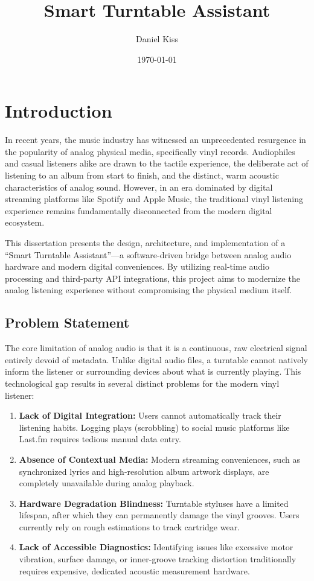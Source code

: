 \documentclass[12pt,a4paper,english]{report}
\title{Smart Turntable Assistant}
\author{Daniel Kiss}
\date{\today}
\begin{document}
\maketitle
\tableofcontents

\chapter{Introduction}

In recent years, the music industry has witnessed an unprecedented resurgence in the popularity of analog physical media, specifically vinyl records. Audiophiles and casual listeners alike are drawn to the tactile experience, the deliberate act of listening to an album from start to finish, and the distinct, warm acoustic characteristics of analog sound. However, in an era dominated by digital streaming platforms like Spotify and Apple Music, the traditional vinyl listening experience remains fundamentally disconnected from the modern digital ecosystem. 

This dissertation presents the design, architecture, and implementation of a ``Smart Turntable Assistant''---a software-driven bridge between analog audio hardware and modern digital conveniences. By utilizing real-time audio processing and third-party API integrations, this project aims to modernize the analog listening experience without compromising the physical medium itself.

\section{Problem Statement}

The core limitation of analog audio is that it is a continuous, raw electrical signal entirely devoid of metadata. Unlike digital audio files, a turntable cannot natively inform the listener or surrounding devices about what is currently playing. This technological gap results in several distinct problems for the modern vinyl listener:

\begin{enumerate}
    \item \textbf{Lack of Digital Integration:} Users cannot automatically track their listening habits. Logging plays (scrobbling) to social music platforms like Last.fm requires tedious manual data entry.
    \item \textbf{Absence of Contextual Media:} Modern streaming conveniences, such as synchronized lyrics and high-resolution album artwork displays, are completely unavailable during analog playback.
    \item \textbf{Hardware Degradation Blindness:} Turntable styluses have a limited lifespan, after which they can permanently damage the vinyl grooves. Users currently rely on rough estimations to track cartridge wear.
    \item \textbf{Lack of Accessible Diagnostics:} Identifying issues like excessive motor vibration, surface damage, or inner-groove tracking distortion traditionally requires expensive, dedicated acoustic measurement hardware.
\end{enumerate}
\end{document}
